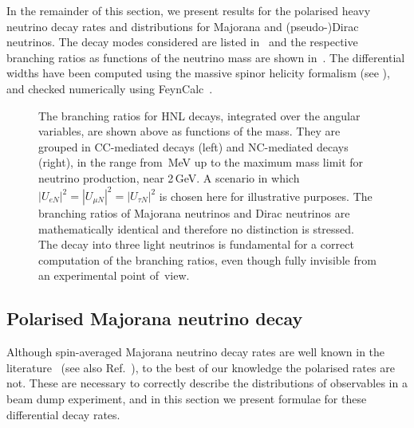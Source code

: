 In the remainder of this section, we present results for the polarised heavy neutrino decay rates %
and distributions for Majorana and (pseudo-)Dirac neutrinos.
The decay modes considered are listed in~ and the respective branching ratios as functions of %
the neutrino mass are shown in~.
%
The differential widths have been computed using the massive spinor helicity formalism %
(see \eg {}), and checked numerically using %
FeynCalc~\cite{Shtabovenko:2016sxi,Mertig:1990an}.

\begin{figure}
	\centering
	\footnotesize
	\caption{The branching ratios for HNL decays, integrated over the angular variables, are shown above %
		as functions of the mass.
		They are grouped in CC-mediated decays (left) and NC-mediated decays (right), in the range from \,MeV up to %
		the maximum mass limit for neutrino production, near 2\,GeV. 
		A scenario in which $|U_{e N}|^2=|U_{\mu N}|^2=|U_{\tau N}|^2$ is chosen here %
		for illustrative purposes.
		The branching ratios of Majorana neutrinos and Dirac neutrinos are mathematically identical and %
		therefore no distinction is stressed.
		The decay into three light neutrinos is fundamental for a correct computation %
		of the branching ratios, even though fully invisible from an experimental point of~view.}
	\label{fig:branch}
\end{figure}

\subsection{Polarised Majorana neutrino decay}

Although spin-averaged Majorana neutrino decay rates are well known in the literature~\cite{Atre:2009rg,Gorbunov:2007ak,Helo:2010cw} %
(see also Ref.~\cite{Bondarenko:2018ptm}), to the best of our knowledge the polarised rates are not.
These are necessary to correctly describe the distributions of observables in a beam dump experiment, %
and in this section we present formulae for these differential decay rates. 

